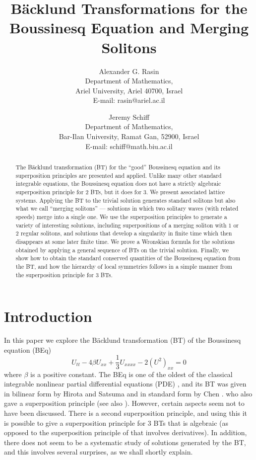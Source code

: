 \documentclass[12pt]{article}
\title{B\"acklund Transformations for the Boussinesq Equation and Merging Solitons}
\author{Alexander G. Rasin  \\
Department of Mathematics,\\ 
Ariel University, Ariel 40700, Israel \\
{E-mail: rasin@ariel.ac.il}\and  Jeremy Schiff \\
Department of Mathematics,\\
Bar-Ilan University, Ramat Gan, 52900, Israel \\
{E-mail: schiff@math.biu.ac.il}}
\begin{document}
\maketitle
\begin{abstract}{
    The B\"acklund transformation (BT) for the ``good'' Boussinesq equation and its
    superposition principles are presented and applied. Unlike many other standard integrable
    equations, the Boussinesq equation does not have a strictly algebraic superposition principle
    for 2 BTs, but it does for 3. We present associated lattice systems.
    Applying the BT to the trivial solution generates standard solitons but also what we
    call ``merging solitons'' --- solutions in which two solitary waves (with related speeds)
    merge into a single one. We use the superposition principles to generate a variety of interesting solutions,
    including superpositions of a merging soliton with $1$ or $2$ regular solitons, and solutions that
    develop a singularity in finite time which then disappears at some later finite time. We prove a
    Wronskian formula for the solutions obtained by applying a general sequence of BTs on the trivial solution. 
    Finally, we show how to obtain the standard conserved quantities of the Boussinesq equation from the BT, and 
    how the hierarchy of local symmetries follows in a simple manner from the superposition principle for 3 BTs.}
\end{abstract}

\section{Introduction} 

In this paper we explore the B\"acklund transformation (BT) of the Boussinesq equation (BEq)
\begin{equation}
  U_{tt} - 4\beta U_{xx} + {\textstyle{\frac13}} U_{xxxx} - 2(U^2)_{xx} = 0   \label{be} 
\end{equation}   
where $\beta$ is a positive constant. The BEq is one of the oldest of the classical 
integrable nonlinear partial differential equations (PDE) \cite{b1,b2}, and its BT 
was given in bilinear form by Hirota and Satsuma \cite{beq17} and in standard form by Chen \cite{beq45}. 
who also gave a superposition principle 
(see also \cite{beq21, beq18, beq16}). However, certain aspects seem not to have been discussed. There is a
second superposition principle, and using this it is possible to give a superposition principle for
3 BTs that is algebraic (as opposed to the superposition principle of \cite{beq45} that involves derivatives). 
In addition, there does not seem to be a systematic study of solutions generated by the BT, and this involves
several surprises, as we shall shortly explain. 
\end{document}
